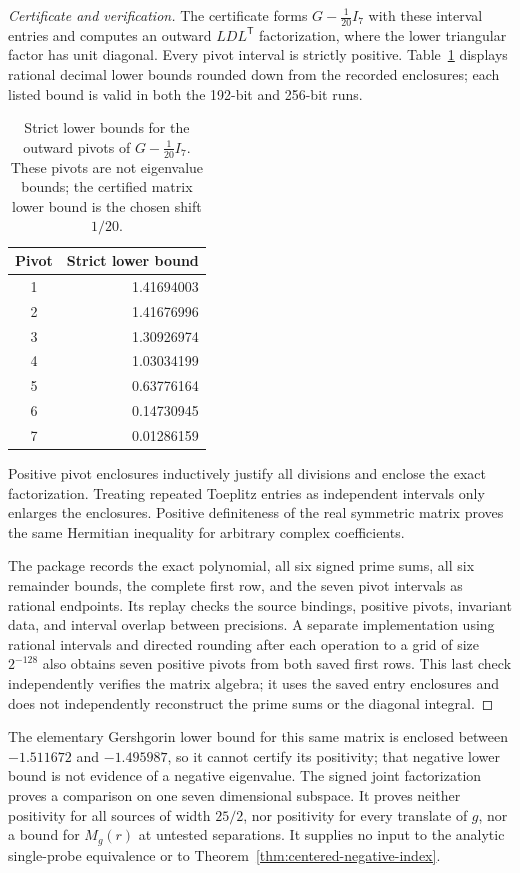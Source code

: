 \documentclass[11pt]{article}
\numberwithin{equation}{section}
\theoremstyle{definition}
\theoremstyle{remark}
\begin{document}
\begin{proof}[Certificate and verification]
The certificate forms \(G-\frac1{20}I_7\) with these interval entries
and computes an outward \(LDL^{\mathsf T}\) factorization, where the
lower triangular factor has unit diagonal.  Every pivot interval is
strictly positive.  Table~\ref{tab:seven-source-pivots} displays rational
decimal lower bounds rounded down from the recorded enclosures; each
listed bound is valid in both the 192-bit and 256-bit runs.
\begin{table}[htbp]
\centering
\begin{tabular}{c|r}
Pivot & Strict lower bound\\
\hline
1 & 1.41694003\\
2 & 1.41676996\\
3 & 1.30926974\\
4 & 1.03034199\\
5 & 0.63776164\\
6 & 0.14730945\\
7 & 0.01286159
\end{tabular}
\caption{Strict lower bounds for the outward pivots of
\(G-\frac1{20}I_7\).  These pivots are not eigenvalue bounds;
the certified matrix lower bound is the chosen shift \(1/20\).}
\label{tab:seven-source-pivots}
\end{table}
Positive pivot enclosures inductively justify all divisions and enclose
the exact factorization.  Treating repeated Toeplitz entries as
independent intervals only enlarges the enclosures.  Positive definiteness
of the real symmetric matrix proves the same Hermitian inequality for
arbitrary complex coefficients.

The package \cite{JointProbeCertificate} records the exact polynomial,
all six signed prime sums, all six remainder bounds, the complete first
row, and the seven pivot intervals as rational endpoints.  Its replay
checks the source bindings, positive pivots, invariant data, and interval
overlap between precisions.  A separate implementation using rational
intervals and directed rounding after each operation to a grid of size
\(2^{-128}\) also obtains seven positive pivots from both saved first
rows.  This last check independently verifies the matrix algebra; it
uses the saved entry enclosures and does not independently reconstruct
the prime sums or the diagonal integral.
\end{proof}

The elementary Gershgorin lower bound for this same matrix is enclosed
between \(-1.511672\) and \(-1.495987\), so it cannot certify its
positivity; that negative lower bound is not evidence of a negative
eigenvalue.  The signed joint factorization proves a comparison on one
seven dimensional subspace.  It proves neither positivity for all
sources of width \(25/2\), nor positivity for every translate of \(g\),
nor a bound for \(M_g(r)\) at untested separations.  It supplies no input
to the analytic single-probe equivalence or to
Theorem~\ref{thm:centered-negative-index}.
\end{document}
